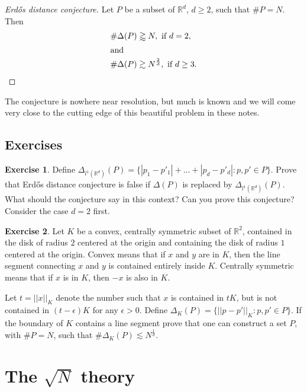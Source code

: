 \documentclass[]{stml-l}
\numberwithin{equation}{chapter}
\theoremstyle{plain}
\theoremstyle{definition}
\newtheorem{exercise}{Exercise}[chapter]
\theoremstyle{remark}
\begin{document}
\begin{proof}[Erd\H{o}s distance conjecture] Let $P$ be a subset of
$\mathbb{R}^d$, $d \ge 2$, such that $\# P=N$. Then
\begin{align}
\# \Delta(P) &\gtrapprox N, \ \text{if} \ d=2, \\ \intertext{and}
\# \Delta(P) &\gtrsim N^{\frac{2}{d}}, \ \text{if} \ d \ge 3.
\end{align}
\end{proof}

The conjecture is nowhere near resolution, but much is known and
we will come very close to the cutting edge of this beautiful
problem in these notes.


\section*{Exercises}

\begin{exercise} \label{ex0.1}
Define $\Delta_{l^1({\mathbb R}^d)}(P)=\{|p_1-p'_1|+\dots+|p_d-p'_d|:
p,p' \in P\}$. Prove that Erd\H{o}s distance conjecture is false
if $\Delta(P)$ is replaced by $\Delta_{l^1(\mathbb{R}^d)}(P)$.
What should the conjecture say in this context? Can you prove this
conjecture?  Consider the case $d=2$ first.  \end{exercise}

\begin{exercise} \label{ex0.2}
Let $K$ be a convex, centrally symmetric subset of $\mathbb{R}^2$,
contained in the disk of radius $2$ centered at the origin and
containing the disk of radius $1$ centered at the origin. Convex
means that if $x$ and $y$ are in $K$, then the line segment
connecting $x$ and $y$ is contained entirely inside $K$. Centrally
symmetric means that if $x$ is in $K$, then $-x$ is also in $K$.

Let $t={||x||}_K$ denote the number such that $x$ is contained in
$tK$, but is not contained in $(t-\epsilon)K$ for any
$\epsilon>0$. Define $\Delta_K(P)=\{{||p-p'||}_K: p,p' \in P\}$.
If the boundary of $K$ contains a line segment prove that one can
construct a set $P$, with $\# P=N$, such that $\# \Delta_K(P)
\lesssim N^{\frac{1}{d}}$. \end{exercise}


\chapter{The $\sqrt{N}$ theory}
\end{document}
